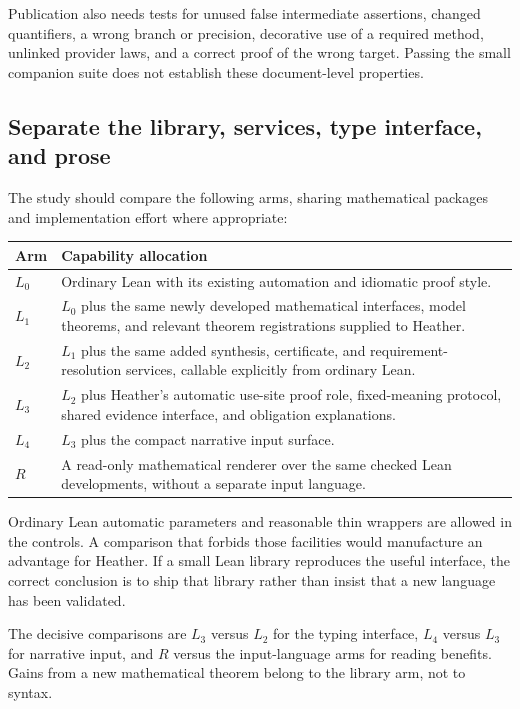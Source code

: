 \documentclass[11pt,letterpaper]{article}
\theoremstyle{definition}\newtheorem{definition}[theorem]{Definition}
\theoremstyle{remark}\newtheorem{remark}[theorem]{Remark}
\begin{document}
Publication also needs tests for unused false intermediate assertions, changed
quantifiers, a wrong branch or precision, decorative use of a required method,
unlinked provider laws, and a correct proof of the wrong target. Passing the
small companion suite does not establish these document-level properties.

\subsection{Separate the library, services, type interface, and prose}
The study should compare the following arms, sharing mathematical packages
and implementation effort where appropriate:
\begin{center}\small
\begin{tabularx}{\textwidth}{@{}P{0.10\textwidth}Y@{}}
\toprule Arm & Capability allocation\\\midrule
$L_0$ & Ordinary Lean with its existing automation and idiomatic proof style.\\
$L_1$ & $L_0$ plus the same newly developed mathematical interfaces, model theorems,
and relevant theorem registrations supplied to Heather.\\
$L_2$ & $L_1$ plus the same added synthesis, certificate, and requirement-resolution
services, callable explicitly from ordinary Lean.\\
$L_3$ & $L_2$ plus Heather's automatic use-site proof role, fixed-meaning protocol,
shared evidence interface, and obligation explanations.\\
$L_4$ & $L_3$ plus the compact narrative input surface.\\
$R$ & A read-only mathematical renderer over the same checked Lean developments,
without a separate input language.\\
\bottomrule
\end{tabularx}
\end{center}

Ordinary Lean automatic parameters and reasonable thin wrappers are allowed
in the controls. A comparison that forbids those facilities would manufacture
an advantage for Heather. If a small Lean library reproduces the useful
interface, the correct conclusion is to ship that library rather than insist
that a new language has been validated.

The decisive comparisons are $L_3$ versus $L_2$ for the typing interface,
$L_4$ versus $L_3$ for narrative input, and $R$ versus the input-language arms
for reading benefits. Gains from a new mathematical theorem belong to the
library arm, not to syntax.
\end{document}
